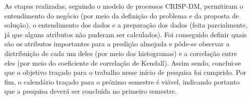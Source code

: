 As etapas realizadas, seguindo o modelo de processos CRISP-DM, permitiram o
entendimento do negócio (por meio da definição do problema e da proposta de solução),
o entendimento dos dados e a preparação dos dados (feita parcialmente, já que alguns
atributos não puderam ser calculados).  
Foi conseguido definir quais são os atributos importantes para a predição almejada
e pôde-se observar a distribuição de cada um deles (por meio dos histogramas) e
a correlação entre eles (por meio do coeficiente de correlação de Kendall). Assim
sendo, conclui-se que o objetivo traçado para o trabalho nesse início de pesquisa foi
cumprido. Por fim, o calendário traçado para o próximo semestre é viável, indicando
portanto que a pesquisa deverá ser concluída no primeiro semestre.  
